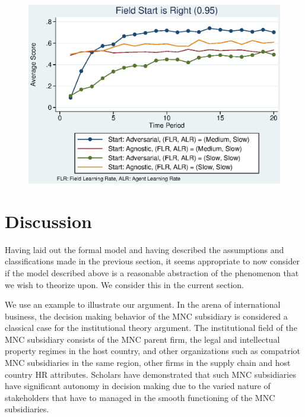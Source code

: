 \documentclass[12pt,letterpaper]{article}
\begin{document}
\begin{figure}[h]
\begin{centering}
  \caption{}
  \includegraphics[width=\textwidth]{frcmedium3b}
  \label{fig:3b}
\end{centering}
\end{figure}

\section{Discussion}
Having laid out the formal model and having described the assumptions and classifications made in the previous section, it seems appropriate to now consider if the model described above is a reasonable abstraction of the phenomenon that we wish to theorize upon. We consider this in the current section.

We use an example to illustrate our argument. In the arena of international business, the decision making behavior of the MNC subsidiary is considered a classical case for the institutional theory argument. The institutional field of the MNC subsidiary consists of the MNC parent firm, the legal and intellectual property regimes in the host country, and other organizations such as compatriot MNC subsidiaries in the same region, other firms in the supply chain and host country HR attributes. Scholars have demonstrated that such MNC subsidiaries have significant autonomy in decision making due to the varied nature of stakeholders that have to managed in the smooth functioning of the MNC subsidiaries. 
\end{document}
